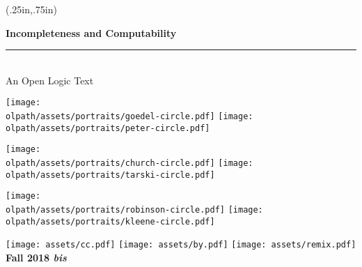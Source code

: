 \pagecolor{ltleadbeater}
  \begin{textblock*}{4.5in}(.25in,.75in)%
    \begin{raggedright}
      \fontsize{26pt}{30pt}\selectfont\bfseries\sffamily%
      Incompleteness and Computability\\[5pt]
      \normalfont\fontsize{18pt}{0pt}\selectfont\bfseries\itshape%
      \rule{4.5in}{5pt}\\[5pt]
      An Open Logic Text
    \end{raggedright}

\vskip1cm

\noindent\texttt{[image: \\olpath/assets/portraits/goedel-circle.pdf]}
\texttt{[image: \\olpath/assets/portraits/peter-circle.pdf]}\\
\centerline{\texttt{[image: \\olpath/assets/portraits/church-circle.pdf]}
\texttt{[image: \\olpath/assets/portraits/tarski-circle.pdf]}}

\hfill\texttt{[image: \\olpath/assets/portraits/robinson-circle.pdf]}
\texttt{[image: \\olpath/assets/portraits/kleene-circle.pdf]}

\vskip1cm

\noindent
\texttt{[image: assets/cc.pdf]}
\texttt{[image: assets/by.pdf]}
\texttt{[image: assets/remix.pdf]}
\normalfont\fontsize{16pt}{0pt}\selectfont\bfseries\sffamily%
\hfill Fall 2018 \textit{bis}
\end{textblock*}
\

\clearpage
\setcounter{page}{1}
\nopagecolor


